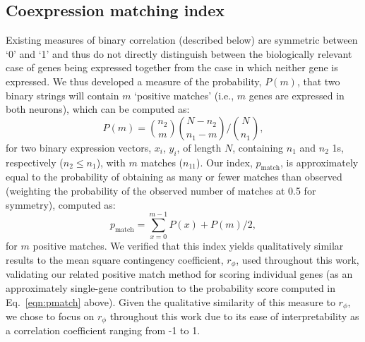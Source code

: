 \documentclass[10pt,letterpaper]{article}
\begin{document}
{%

\subsection*{Coexpression matching index}

Existing measures of binary correlation (described below) are symmetric between `0' and `1' and thus do not directly distinguish between the biologically relevant case of genes being expressed together from the case in which neither gene is expressed.
We thus developed a measure of the probability, $P(m)$, that two binary strings will contain $m$ `positive matches' (i.e., $m$ genes are expressed in both neurons), which can be computed as:
\begin{equation} \label{eqn:positiveMatch}
    P(m) = \binom{n_2}{m} \binom{N-n_2}{n_1-m} / \binom{N}{n_1},
\end{equation}
for two binary expression vectors, $x_i$, $y_i$, of length $N$, containing $n_1$ and $n_2$ 1s, respectively ($n_2 \leq n_1$), with $m$ matches ($n_{11}$).
Our index, $p_\mathrm{match}$, is approximately equal to the probability of obtaining as many or fewer matches than observed (weighting the probability of the observed number of matches at 0.5 for symmetry), computed as:
\begin{equation} \label{eqn:pmatch}
     p_\mathrm{match} = \sum_{x=0}^{m-1} P(x) + P(m)/2,
\end{equation}
for $m$ positive matches.
We verified that this index yields qualitatively similar results to the mean square contingency coefficient, $r_\phi$, used throughout this work, validating our related positive match method for scoring individual genes (as an approximately single-gene contribution to the probability score computed in Eq.~\ref{eqn:pmatch} above).
Given the qualitative similarity of this measure to $r_\phi$, we chose to focus on $r_\phi$ throughout this work due to its ease of interpretability as a correlation coefficient ranging from -1 to 1.

}
\end{document}
